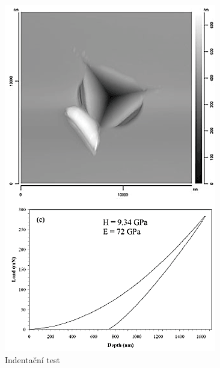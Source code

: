 \documentclass[12pt]{article}
\begin{document}
\begin{figure}[ht]
\begin{minipage}[b]{0.45\linewidth}
\centering
\includegraphics[width=\textwidth]{berkovitz.png}
\caption{Indentační test}
\label{fig:figure1}
\end{minipage}
\hspace{0.5cm}
\begin{minipage}[b]{0.45\linewidth}
\centering

\end{minipage}
\end{figure}
\end{document}
